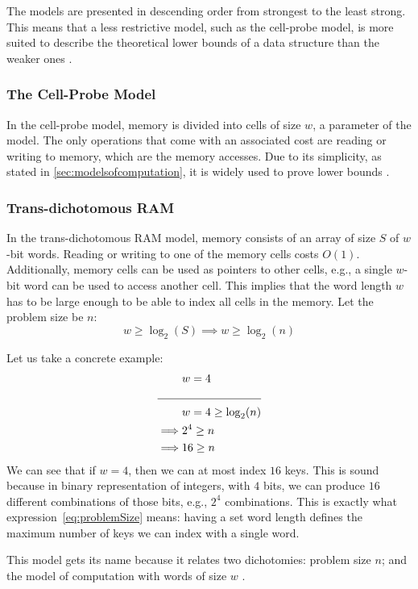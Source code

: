 The models are presented in descending order from strongest to the least strong. This means that a less restrictive model, such as the cell-probe model, is more suited to describe the theoretical lower bounds of a data structure than the weaker ones \cite{erikdemainelec11}.

\subsubsection{The Cell-Probe Model}
In the cell-probe model, memory is divided into cells of size $w$, a parameter of the model.
The only operations that come with an associated cost are reading or writing to memory, which are the memory accesses.
Due to its simplicity, as stated in \ref{sec:modelsofcomputation}, it is widely used to prove lower bounds \cite{erikdemainelec11}.

\subsubsection{Trans-dichotomous RAM} \label{sec:transdichotomousRAM}
In the trans-dichotomous RAM model, memory consists of an array of size $S$ of $w$-bit words.
Reading or writing to one of the memory cells costs $O(1)$.
Additionally, memory cells can be used as pointers to other cells, e.g., a single $w$-bit word can be used to access another cell.
This implies that the word length $w$ has to be large enough to be able to index all cells in the memory.
Let the problem size be $n$:
\begin{equation} \label{eq:problemSize}
    w \ge \log_2(S) \implies w \ge \log_2(n)
\end{equation}

Let us take a concrete example:
\begin{align*}
    &w = 4 \\
    \cline{1-2}
    &w = 4 \geq \log_2(n) \\
    \implies &2^4 \geq n \\
    \implies &16 \geq n
\end{align*}
We can see that if $w = 4$, then we can at most index $16$ keys. This is sound because in binary representation of integers, with $4$ bits, we can produce $16$ different combinations of those bits, e.g., $2^4$ combinations. This is exactly what expression~\ref{eq:problemSize} means: having a set word length defines the maximum number of keys we can index with a single word.

This model gets its name because it relates two dichotomies: problem size $n$; and the model of computation with words of size $w$ \cite{erikdemainelec11}. 

